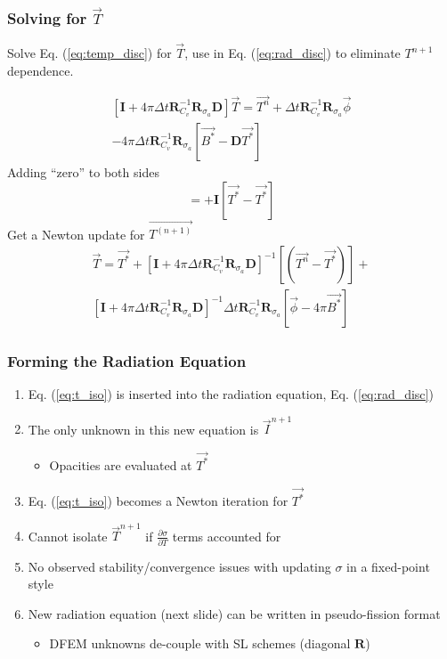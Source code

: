 \documentclass{beamer}
\newcommand{\be}{\begin{equation*}}   %
\newcommand{\ee}{\end{equation*}}
\newcommand{\eqt}[1]{Eq. (\ref{#1})}  %
\newcommand{\p}{\ensuremath{ \partial}}			%
\newcommand{\R}{\ensuremath{ \mathbf{R} }}
\newcommand{\D}{\ensuremath{ \mathbf{D} }}
\newcommand{\I}{\ensuremath{ \mathbf{I} }}
\begin{document}
\begin{frame}
\frametitle{Solving for $\vec{T}$}
Solve \eqt{eq:temp_disc} for $\vec{T}$, use in \eqt{eq:rad_disc} to eliminate $T^{n+1}$ dependence.

\begin{multline*}
\left[ \I + 4\pi \Delta t \R_{C_v}^{-1} \R_{\sigma_a} \D  \right]\vec{T} = \vec{T^n}  +  \Delta t \R_{C_v}^{-1} \R_{\sigma_a}  \vec{ \phi}  \\ -
 4\pi \Delta t \R_{C_v}^{-1} \R_{\sigma_a}  \left[  \vec{B^*} - \D \vec{T^*} \right] 
\end{multline*}
Adding ``zero'' to both sides
\be
= + \I \left[\vec{T^*} - \vec{T^*} \right]
\ee
Get a Newton update for $\vec{T^{(n+1)}}$
\begin{multline}
\label{eq:t_iso}
\vec{T} = \vec{T^*} + \left[ \I + 4\pi \Delta t \R_{C_v}^{-1} \R_{\sigma_a} \D  \right]^{-1} \left[  (\vec{T^n}-\vec{T^*}) \right] +  \\
\left[ \I + 4\pi \Delta t \R_{C_v}^{-1} \R_{\sigma_a} \D  \right]^{-1}  \Delta t \R_{C_v}^{-1}\R_{\sigma_a} \left[ \vec{ \phi} - 4\pi \vec{B^*} \right] 
\end{multline}
\end{frame}

\begin{frame}
\frametitle{Forming the Radiation Equation}
\begin{enumerate}
\item \eqt{eq:t_iso} is inserted into the radiation equation, \eqt{eq:rad_disc}
\item The only unknown in this new equation is $\vec{I}^{n+1}$
\begin{itemize}
\item Opacities are evaluated at $\vec{T^*}$
\end{itemize}
\item \eqt{eq:t_iso} becomes a Newton iteration for $\vec{T^*}$
\item Cannot isolate $\vec{T}^{n+1}$ if $\frac{\p \sigma}{\p T}$ terms accounted for
\item No observed stability/convergence issues with updating $\sigma$ in a fixed-point style
\item New radiation equation (next slide) can be written in pseudo-fission format
\begin{itemize}
\item DFEM unknowns de-couple with SL schemes (diagonal \R)
\end{itemize}
\end{enumerate}
\end{frame}
\end{document}
